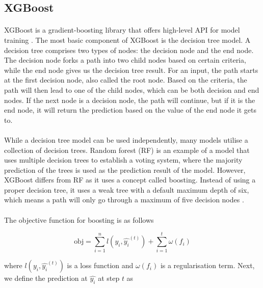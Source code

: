 \documentclass[12pt,oneside]{report}
\begin{document}
\subsection{XGBoost}
\paragraph{}
XGBoost is a gradient-boosting library that offers high-level API for model training \cite{chen_xgboost_2016}. The most basic component of XGBoost is the decision tree model. A decision tree comprises two types of nodes: the decision node and the end node. The decision node forks a path into two child nodes based on certain criteria, while the end node gives us the decision tree result. For an input, the path starts at the first decision node, also called the root node. Based on the criteria, the path will then lead to one of the child nodes, which can be both decision and end nodes. If the next node is a decision node, the path will continue, but if it is the end node, it will return the prediction based on the value of the end node it gets to.

\paragraph{}
While a decision tree model can be used independently, many models utilise a collection of decision trees. Random forest (RF) \cite{breiman_random_2001} is an example of a model that uses multiple decision trees to establish a voting system, where the majority prediction of the trees is used as the prediction result of the model. However, XGBoost differs from RF as it uses a concept called boosting. Instead of using a proper decision tree, it uses a weak tree with a default maximum depth of six, which means a path will only go through a maximum of five decision nodes \cite{chen_xgboost_2016}.

\paragraph{}
The objective function for boosting is as follows

\begin{equation}
    \text{obj} =
    \sum_{i=1}^n l(y_i, \hat{y_i}^{(t)}) +
    \sum_{i=1}^t \omega (f_i)
\end{equation}

where $l(y_i, \hat{y_i}^{(t)})$ is a loss function and $\omega (f_i)$ is a regularisation term. Next, we define the prediction at $\hat{y_i}$ at step $t$ as
\end{document}
